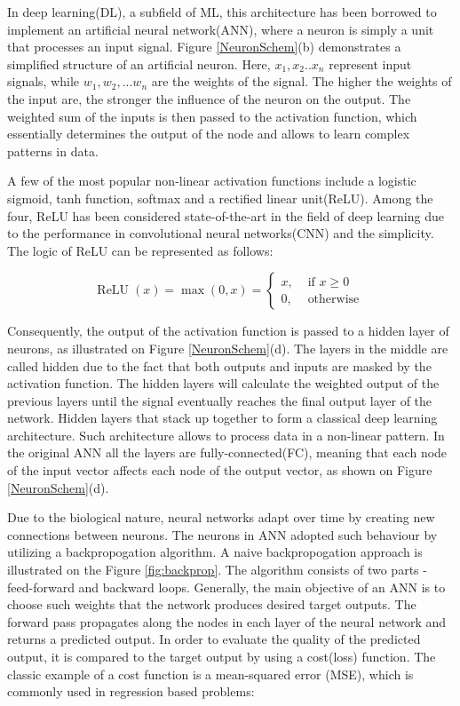 \documentclass[english, 12pt, a4paper, elec, utf8, a-1b, online]{aaltothesis}
\begin{document}
In deep learning(DL), a subfield of ML, this architecture has been borrowed to implement an artificial neural network(ANN), where a neuron is simply a unit that processes an input signal. Figure \ref{NeuronSchem}(b) demonstrates a simplified structure of an artificial neuron. Here, $x_1, x_2..x_n$ represent input signals, while $w_1, w_2, ... w_n$ are the weights of the signal. The higher the weights of the input are, the stronger the influence of the neuron on the output. The weighted sum of the inputs is then passed to the activation function, which essentially determines the output of the node and allows to learn complex patterns in data. \cite{Mehlig_2021} 

A few of the most popular non-linear activation functions include a logistic sigmoid, tanh function, softmax and a rectified linear unit(ReLU). Among the four, ReLU has been considered state-of-the-art in the field of deep learning due to the performance in convolutional neural networks(CNN) \cite{Dubey2021} and the simplicity. The logic of ReLU can be represented as follows: 
  
\begin{equation}
	\operatorname{ReLU}(x)=\max (0, x)= \begin{cases}x, & \text { if } x \geq 0 \\ 0, & \text { otherwise }\end{cases}
\end{equation}

Consequently, the output of the activation function is passed to a hidden layer of neurons, as illustrated on Figure \ref{NeuronSchem}(d). The layers in the middle are called hidden due to the fact that both outputs and inputs are masked by the activation function.  The hidden layers will calculate the weighted output of the previous layers until the signal eventually reaches the final output layer of the network. Hidden layers that stack up together to form a classical deep learning architecture. \cite{OShea2015} Such architecture allows to process data in a non-linear pattern. In the original ANN all the layers are fully-connected(FC), meaning that each node of the input vector affects each node of the output vector, as shown on Figure \ref{NeuronSchem}(d).


Due to the biological nature, neural networks adapt over time by creating new connections between neurons. The neurons in ANN adopted such behaviour by utilizing a backpropogation algorithm\cite{Rumelhart:1986we}. A naive backpropogation approach is illustrated on the Figure \ref{fig:backprop}. The algorithm consists of two parts - feed-forward and backward loops. Generally, the main objective of an ANN is to choose such weights that the network produces desired target outputs. The forward pass propagates along the nodes in each layer of the neural network and returns a predicted output. In order to evaluate the quality of the predicted output, it is compared to the target output by using a cost(loss) function. The classic example of a cost function is a mean-squared error (MSE), which is commonly used in regression based problems:  
\end{document}
